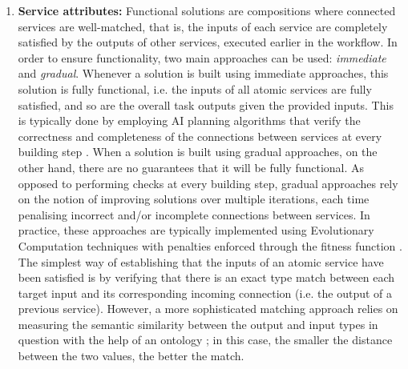 \begin{enumerate}


 \item \textbf{Service attributes:} Functional solutions are compositions where connected services are well-matched, that is, the inputs of each service are completely satisfied by the outputs of other services, executed earlier in the workflow. In order to ensure functionality, two main approaches can be used: \emph{immediate} and \emph{gradual}. Whenever a solution is built using immediate approaches, this solution is fully functional, i.e. the inputs of all atomic services are fully satisfied, and so are the overall task outputs given the provided inputs. This is typically done by employing AI planning algorithms that verify the correctness and completeness of the connections between services at every building step \cite{wang2014automated}. When a solution is built using gradual approaches, on the other hand, there are no guarantees that it will be fully functional. As opposed to performing checks at every building step, gradual approaches rely on the notion of improving solutions over multiple iterations, each time penalising incorrect and/or incomplete connections between services. In practice, these approaches are typically implemented using Evolutionary Computation techniques with penalties enforced through the fitness function \cite{rodriguez2010composition}. The simplest way of establishing that the inputs of an atomic service have been satisfied is by verifying that there is an exact type match between each target input and its corresponding incoming connection (i.e. the output of a previous service). However, a more sophisticated matching approach relies on measuring the semantic similarity between the output and input types in question with the help of an ontology \cite{DBLP:journals/soca/BoustilMS14}; in this case, the smaller the distance between the two values, the better the match.

\end{enumerate}
